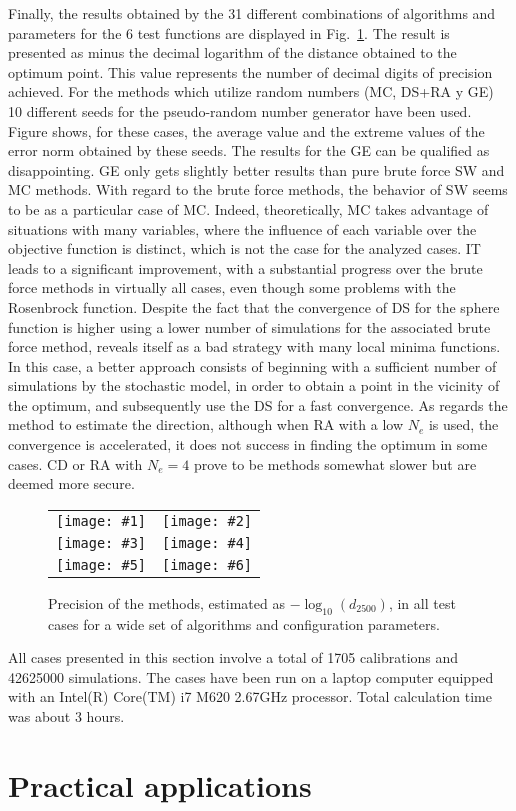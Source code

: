 \documentclass[review,authoryear]{elsarticle}
\newcommand{\FIGVI}[8]
{
	\begin{figure}[ht!]
		\centering
		\begin{tabular}{cc}
			\texttt{[image: \#1]} & \texttt{[image: \#2]} \\
			\texttt{[image: \#3]} & \texttt{[image: \#4]} \\
			\texttt{[image: \#5]} & \texttt{[image: \#6]}
		\end{tabular}
		\caption{#7.\label{#8}}
	\end{figure}
}
\newcommand{\PA}[1]{\left(#1\right)}
\begin{document}
Finally, the results obtained by the 31 different combinations of algorithms
and parameters for the 6 test functions are displayed in
Fig.~\ref{FigTestResults}. 
The result is presented as minus the decimal logarithm of the distance obtained
to the optimum point. This value represents the number of decimal digits of 
precision achieved.
For the methods which utilize random numbers (MC, DS+RA y GE) 10 different
seeds for the pseudo-random number generator have been used. Figure shows, for
these cases, the average value and the extreme values of the error norm obtained
by these seeds. 
The results for the GE can be qualified as disappointing. GE only gets slightly
better results than pure brute force SW and MC methods.
With regard to the brute force methods, the behavior of SW seems to be as a
particular case of MC. Indeed, theoretically, MC takes advantage of situations
with many variables, where the influence of each  variable over the objective
function is distinct, which is not the case for the analyzed cases.
IT leads to a significant improvement, with a substantial progress over the
brute force methods in virtually all cases, even though some problems with the
Rosenbrock function. 
Despite the fact that the convergence of DS for the sphere function is higher
using a lower number of simulations for the associated brute force method,
reveals itself as a bad strategy with many local minima functions. In this case,
a better approach consists of beginning with a sufficient number of simulations
by the stochastic model, in order to obtain a point in the vicinity of the
optimum, and subsequently use the DS for a fast convergence. As regards the
method to estimate the direction, although when RA with a low $N_e$ is used, the
convergence is accelerated, it does not success in finding the optimum in some
cases. CD or RA with $N_e=4$ prove to be methods somewhat slower but are deemed
more secure.
\FIGVI{Sphere-e.eps}{Ackley-e.eps}{Booth-e.eps}{Rosenbrock-e.eps}{Easom-e.eps}
{Beale-e.eps}{Precision of the methods, estimated as $-\log_{10}\PA{d_{2500}}$,
in all test cases for a wide set of algorithms and configuration parameters}
{FigTestResults}

All cases presented in this section involve a total of 1705 calibrations and
42625000 simulations. The cases have been run on a laptop
computer equipped with an Intel(R) Core(TM) i7 M620 2.67GHz processor. Total
calculation time was about 3 hours.

\section{Practical applications}
\end{document}
